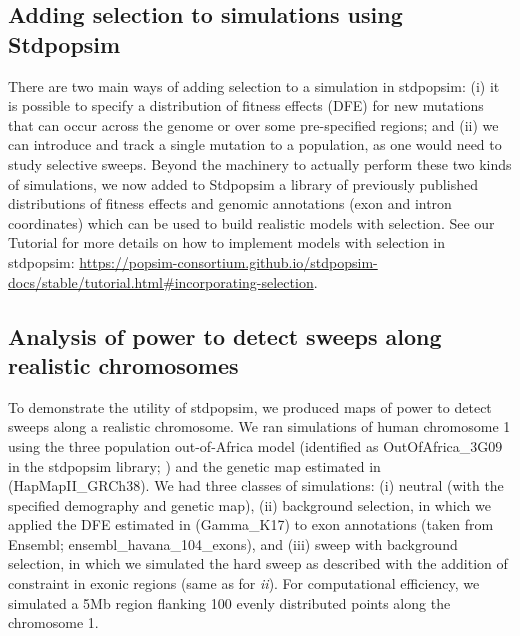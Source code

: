 \subsection{Adding selection to simulations using Stdpopsim}

There are two main ways of adding selection to a simulation in stdpopsim: (i) it is possible to specify a distribution of fitness effects (DFE) for new mutations that can occur across the genome or over some pre-specified regions; and (ii) we can introduce and track a single mutation to a population, as one would need to study selective sweeps.
Beyond the machinery to actually perform these two kinds of simulations, we now added to Stdpopsim a library of previously published distributions of fitness effects and genomic annotations (\eg exon and intron coordinates) which can be used to build realistic models with selection.
See our Tutorial for more details on how to implement models with selection in stdpopsim: \url{https://popsim-consortium.github.io/stdpopsim-docs/stable/tutorial.html#incorporating-selection}.

\subsection{Analysis of power to detect sweeps along realistic chromosomes}

To demonstrate the utility of stdpopsim, we produced maps of power to detect sweeps along a realistic chromosome.
We ran simulations of human chromosome 1 using the three population out-of-Africa model (identified as OutOfAfrica\_3G09 in the stdpopsim library; \cite{gutenkunst_inferring_2009}) and the genetic map estimated in \citet{frazer_second_2007} (HapMapII\_GRCh38).
We had three classes of simulations: (i) neutral (with the specified demography and genetic map), (ii) background selection, in which we applied the DFE estimated in \citet{kim_inference_2017} (Gamma\_K17) to exon annotations (taken from Ensembl; ensembl\_havana\_104\_exons), and (iii) sweep with background selection, in which we simulated the hard sweep as described with the addition of constraint in exonic regions (same as for \emph{ii}).
For computational efficiency, we simulated a 5Mb region flanking 100 evenly distributed points along the chromosome 1.

